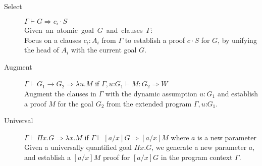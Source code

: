 \documentclass{llncs}
\newcommand{\fighead}{\hrule\vspace{1.5ex}}
\newcommand{\vd}{\vdash}
\newcommand{\arrow}{\rightarrow}
\newcommand{\oftp}{\mathord{:}}
\begin{document}

\begin{small}
\begin{description}
\item[Select] $\Gamma \vd  G \Rightarrow c_i \cdot S$ \\
    \mbox{Given an atomic goal $G$ and clauses $\Gamma$:}\hfill\\
     Focus on a clauses $c_i : A_i$ from $\Gamma$ to establish a proof
     $c\cdot S$ for $G$, by unifying the head of $A_i$ with the current
     goal $G$. 

\item[Augment] $\Gamma \vd  G_1 \arrow G_2 \Rightarrow \lambda u. M$ if $\Gamma,
  u\oftp G_1 \vd M : G_2 \Rightarrow W$ \\
Augment the clauses in $\Gamma$ with the dynamic assumption $u{:} G_1$ and
establish a proof $M$ for the goal $G_2$ from the extended program
$\Gamma, u \oftp G_1$. 
\item[Universal] $\Gamma \vd  \Pi x. G \Rightarrow \lambda x. M$ if $\Gamma \vd
  [a/x]G\Rightarrow [a/x]M$ where $a$ is a new parameter\\
Given a universally quantified goal $\Pi x. G$, we generate a new parameter $a$, and establish a $[a/x]M$ proof  for $[a/x]G$ in the program context $\Gamma$.
\end{description}
\end{small}    
\end{document}

